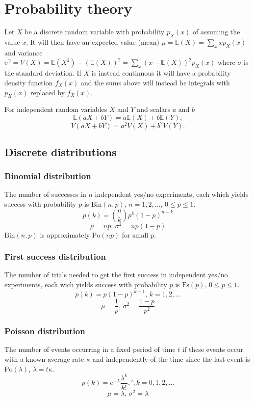 \section{Probability theory}
Let $X$ be a discrete random variable with probability $p_X(x)$ of assuming the value $x$. It will then have an expected value (mean) $\mu=\mathbb{E}(X)=\sum_xxp_X(x)$ and variance $\sigma^2=V(X)=\mathbb{E}(X^2)-(\mathbb{E}(X))^2=\sum_x(x-\mathbb{E}(X))^2p_X(x)$ where $\sigma$ is the standard deviation. If $X$ is instead continuous it will have a probability density function $f_X(x)$ and the sums above will instead be integrals with $p_X(x)$ replaced by $f_X(x)$.

For independent random variables $X$ and $Y$ and scalars $a$ and $b$
$$\mathbb{E}(aX+bY) = a\mathbb{E}(X)+b\mathbb{E}(Y),$$
$$V(aX+bY) = a^2V(X)+b^2V(Y).$$

\subsection{Discrete distributions}

\subsubsection{Binomial distribution}
The number of successes in $n$ independent yes/no experiments, each which yields success with probability $p$ is $\textrm{Bin}(n,p),\,n=1,2,\dots,\, 0\leq p\leq1$.
$$p(k)=\binom{n}{k}p^k(1-p)^{n-k}$$
$$\mu = np,\,\sigma^2=np(1-p)$$
$\textrm{Bin}(n,p)$ is approximately $\textrm{Po}(np)$ for small $p$.

\subsubsection{First success distribution}
The number of trials needed to get the first success in independent yes/no experiments, each wich yields success with probability $p$ is $\textrm{Fs}(p),\,0\leq p\leq1$.
$$p(k)=p(1-p)^{k-1},\,k=1,2,\dots$$
$$\mu = \frac1p,\,\sigma^2=\frac{1-p}{p^2}$$

\subsubsection{Poisson distribution}
The number of events occurring in a fixed period of time $t$ if these events occur with a known average rate $\kappa$ and independently of the time since the last event is $\textrm{Po}(\lambda),\,\lambda=t\kappa$.
$$p(k)=e^{-\lambda}\frac{\lambda^k}{k!},',k=0,1,2,\dots$$
$$\mu=\lambda,\,\sigma^2=\lambda$$

